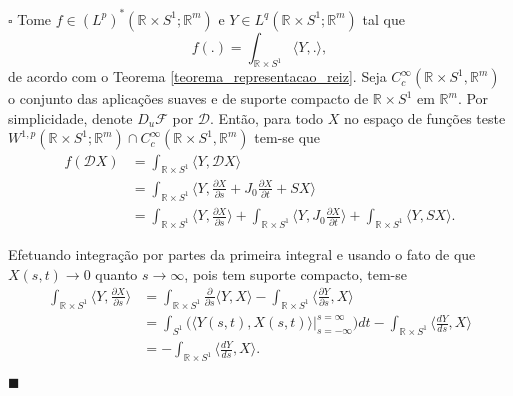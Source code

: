 \documentclass[12pt]{book}
\newenvironment{prova}[1]{$\square$ #1}{\hfill$\blacksquare$}
\newcommand{\bigparenteses}[1]{\Big( #1 \Big) }
\newcommand{\circulo}{S^{1}}
\newcommand{\diferencialfloerponto}[1]{D_{#1}\operadorFloer}
\newcommand{\diferencialfloerabrev}{\mathcal{D}}
\newcommand{\derivada}[2]{\frac{d #1}{d #2}}
\newcommand{\derivadaparcial}[2]{\frac{\partial #1}{\partial #2}}
\newcommand{\espacoLpGeral}[2]{L^{#1}(#2)}
\newcommand{\espacoLpdual}{(L^{p})^{*}(\retacartesianocirculo;\real{m})}
\newcommand{\espacosobolevcontradominio}[2]{W^{1,p}(#1;#2)}
\newcommand{\estruturacomplexa}{J_{0}}
\newcommand{\funcoessupcompactcontradom}[2]{C^{\infty}_{c}(#1, #2)}
\newcommand{\operadorFloer}{\mathcal{F}}
\newcommand{\produtointerno}[2]{\langle #1, #2 \rangle}
\newcommand{\retacartesianocirculo}{\real{} \times \circulo}
\newcommand{\real}[1]{\mathbb{R}^{#1}}
\begin{document}
	\begin{prova} Tome $f \in \espacoLpdual$ e $Y \in \espacoLpGeral{q}{\retacartesianocirculo;\real{m}}$ tal que 
		$$
		f(.) = \int_{\retacartesianocirculo}\produtointerno{Y}{.},
		$$
		de acordo com o Teorema \ref{teorema_representacao_reiz}. Seja  $\funcoessupcompactcontradom{\retacartesianocirculo}{\real{m}}$ o conjunto das aplicações suaves e de suporte compacto de $\retacartesianocirculo$ em $\real{m}$. Por simplicidade, denote $\diferencialfloerponto{u}$ por $\diferencialfloerabrev$. Então, para todo $X$ no espaço de funções teste $\espacosobolevcontradominio{\retacartesianocirculo}{\real{m}} \cap \funcoessupcompactcontradom{\retacartesianocirculo}{\real{m}}$ tem-se que
		$$
		\begin{aligned}
		f(\diferencialfloerabrev X)
		&= \int_{\retacartesianocirculo}\produtointerno{Y}{\diferencialfloerabrev X}
		\\
		&=\int_{\retacartesianocirculo}\produtointerno{Y}{\derivadaparcial{ X}{s}+\estruturacomplexa\derivadaparcial{ X}{t}+S X}
		\\
		&=
		\int_{\retacartesianocirculo}\produtointerno{Y}{\derivadaparcial{ X}{s}} + \int_{\retacartesianocirculo}\produtointerno{Y}{\estruturacomplexa\derivadaparcial{ X}{t}} + \int_{\retacartesianocirculo}\produtointerno{Y}{S X}.
		\end{aligned}
		$$
		
		Efetuando integração por partes da primeira integral e usando o fato de que $ X(s,t) \to  0$ quanto $s \to \infty$, pois tem suporte compacto, tem-se
		$$
		\begin{aligned}
		\int_{\retacartesianocirculo}\produtointerno{Y}{\derivadaparcial{ X}{s}}
		&=\int_{\retacartesianocirculo}\derivadaparcial{}{s}\produtointerno{Y}{ X} - \int_{\retacartesianocirculo}\produtointerno{\derivadaparcial{Y}{s}}{ X} 
		\\
		&=\int_{\circulo}\bigparenteses{\produtointerno{Y(s,t)}{ X(s,t)}\Big|_{s=-\infty}^{s=\infty}}dt -\int_{\retacartesianocirculo}\produtointerno{\derivada{Y}{s}}{ X}
		\\
		&=-\int_{\retacartesianocirculo}\produtointerno{\derivada{Y}{s}}{ X}.
		\end{aligned}
		$$
		

\end{prova}
\end{document}
